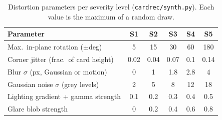 \begin{table}[htbp]\centering\small
\caption[Synthetic distortion severities]{Distortion parameters per severity level (\texttt{cardrec/synth.py}). Each value is the maximum of a random draw.}\label{tab:severity}
\begin{tabular}{@{}lccccc@{}}
\toprule
Parameter & S1 & S2 & S3 & S4 & S5\\
\midrule
Max.\ in-plane rotation ($\pm$deg) & 5 & 15 & 30 & 60 & 180\\
Corner jitter (frac.\ of card height) & 0.02 & 0.04 & 0.07 & 0.1 & 0.14\\
Blur $\sigma$ (px, Gaussian or motion) & 0 & 1 & 1.8 & 2.8 & 4\\
Gaussian noise $\sigma$ (grey levels) & 2 & 5 & 8 & 12 & 18\\
Lighting gradient + gamma strength & 0.1 & 0.2 & 0.3 & 0.4 & 0.5\\
Glare blob strength & 0 & 0.2 & 0.4 & 0.6 & 0.8\\
\bottomrule
\end{tabular}
\end{table}
